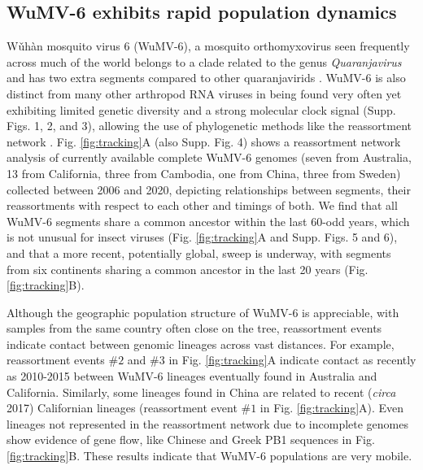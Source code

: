 \documentclass[11pt]{article}
\begin{document}
\subsection{WuMV-6 exhibits rapid population dynamics}

W\v{u}h\`{a}n mosquito virus 6 (WuMV-6), a mosquito orthomyxovirus seen frequently across much of the world \citep{pettersson_meta-transcriptomic_2019,li_unprecedented_2015,shi_high-resolution_2017} belongs to a clade related to the genus \textit{Quaranjavirus} and has two extra segments compared to other quaranjavirids \citep{batson_single_2021}.
WuMV-6 is also distinct from many other arthropod RNA viruses in being found very often yet exhibiting limited genetic diversity and a strong molecular clock signal (Supp. Figs. 1, 2, and 3), allowing the use of phylogenetic methods like the reassortment network \citep{muller_bayesian_2020}.
Fig. \ref{fig:tracking}A (also Supp. Fig. 4) shows a reassortment network analysis of currently available complete WuMV-6 genomes (seven from Australia, 13 from California, three from Cambodia, one from China, three from Sweden) collected between 2006 and 2020, depicting relationships between segments, their reassortments with respect to each other and timings of both.
We find that all WuMV-6 segments share a common ancestor within the last 60-odd years, which is not unusual for insect viruses \citep{webster_discovery_2015} (Fig. \ref{fig:tracking}A and Supp. Figs. 5 and 6), and that a more recent, potentially global, sweep is underway, with segments from six continents sharing a common ancestor in the last 20 years (Fig. \ref{fig:tracking}B).



Although the geographic population structure of WuMV-6 is appreciable, with samples from the same country often close on the tree, reassortment events indicate contact between genomic lineages across vast distances.
For example, reassortment events $\#2$ and $\#3$ in Fig. \ref{fig:tracking}A indicate contact as recently as 2010-2015 between WuMV-6 lineages eventually found in Australia and California.
Similarly, some lineages found in China are related to recent (\textit{circa} 2017) Californian lineages (reassortment event $\#1$ in Fig. \ref{fig:tracking}A).
Even lineages not represented in the reassortment network due to incomplete genomes show evidence of gene flow, like Chinese and Greek PB1 sequences in Fig. \ref{fig:tracking}B.
These results indicate that WuMV-6 populations are very mobile.
\end{document}
